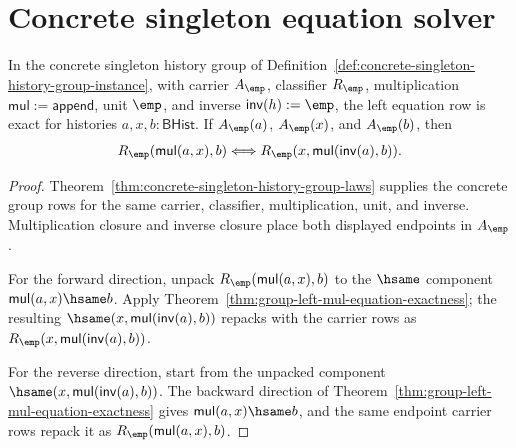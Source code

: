 \section{Concrete singleton equation solver}
\label{sec:group-singleton-equation-solver}

\begin{theorem}
\label{thm:group-singleton-left-equation-exact}
In the concrete singleton history group of
Definition~\ref{def:concrete-singleton-history-group-instance}, with carrier
$A_{\emp}$, classifier $R_{\emp}$, multiplication
$\mathsf{mul}:=\mathsf{append}$, unit $\emp$, and inverse
$\mathsf{inv}(h):=\emp$, the left equation row is exact for histories
$a,x,b:\mathsf{BHist}$. If $A_{\emp}(a)$, $A_{\emp}(x)$, and
$A_{\emp}(b)$, then
$$
R_{\emp}(\mathsf{mul}(a,x),b)
\Longleftrightarrow
R_{\emp}(x,\mathsf{mul}(\mathsf{inv}(a),b)).
$$
\end{theorem}
\begin{proof}
Theorem~\ref{thm:concrete-singleton-history-group-laws} supplies the concrete
group rows for the same carrier, classifier, multiplication, unit, and inverse.
Multiplication closure and inverse closure place both displayed endpoints in
$A_{\emp}$.

For the forward direction, unpack
$R_{\emp}(\mathsf{mul}(a,x),b)$ to the $\hsame$ component
$\mathsf{mul}(a,x)\hsame b$. Apply
Theorem~\ref{thm:group-left-mul-equation-exactness}; the resulting
$\hsame(x,\mathsf{mul}(\mathsf{inv}(a),b))$ repacks with the carrier rows as
$R_{\emp}(x,\mathsf{mul}(\mathsf{inv}(a),b))$.

For the reverse direction, start from the unpacked component
$\hsame(x,\mathsf{mul}(\mathsf{inv}(a),b))$. The backward direction of
Theorem~\ref{thm:group-left-mul-equation-exactness} gives
$\mathsf{mul}(a,x)\hsame b$, and the same endpoint carrier rows repack it as
$R_{\emp}(\mathsf{mul}(a,x),b)$.
\end{proof}

